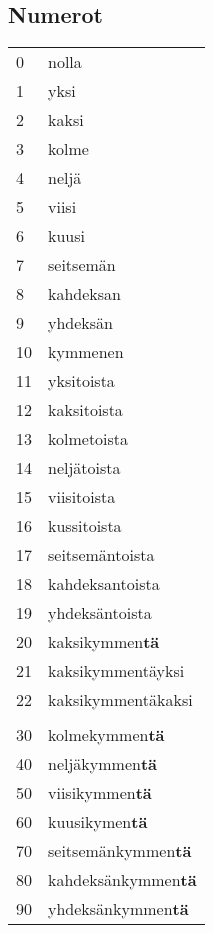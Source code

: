\documentclass[../päätiedosto/pää.tex]{subfiles}
\begin{document}
\subsection[]{Numerot}
\begin{tabularx}{\textwidth}{XX}
0       & nolla              \\
1       & yksi               \\
2       & kaksi              \\
3       & kolme              \\
4       & neljä              \\
5       & viisi              \\
6       & kuusi              \\
7       & seitsemän          \\
8       & kahdeksan          \\
9       & yhdeksän           \\
10      & kymmenen           \\
11      & yksitoista         \\
12      & kaksitoista        \\
13      & kolmetoista        \\
14      & neljätoista        \\
15      & viisitoista        \\
16      & kussitoista        \\
17      & seitsemäntoista    \\
18      & kahdeksantoista    \\
19      & yhdeksäntoista     \\
20      & kaksikymmen\textbf{tä}      \\
21      & kaksikymmentäyksi  \\
22      & kaksikymmentäkaksi \\
        &                    \\
30      & kolmekymmen\textbf{tä}      \\
40      & neljäkymmen\textbf{tä}      \\
50      & viisikymmen\textbf{tä}      \\
60      & kuusikymen\textbf{tä}       \\
70      & seitsemänkymmen\textbf{tä}  \\
80      & kahdeksänkymmen\textbf{tä}  \\
90      & yhdeksänkymmen\textbf{tä}   \\

\end{tabularx}
\end{document}
